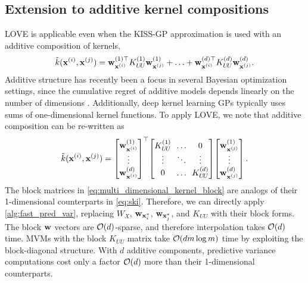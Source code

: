 \subsection{Extension to additive kernel compositions}
LOVE{} is applicable even when the KISS-GP approximation is used with an additive composition of kernels,
%
\begin{equation}
  \tilde{k}(\mathbf{x}^{(i)}, \mathbf{x}^{(j)}) =
  \mathbf{w}^{(1)\top}_{\mathbf{x}^{(i)}} K^{(1)}_{U \! U} \mathbf{w}^{(1)}_{\mathbf{x}^{(j)}} + \ldots + \mathbf{w}^{(d)\top}_{\mathbf{x}^{(i)}} K^{(d)}_{U \! U} \mathbf{w}^{(d)}_{\mathbf{x}^{(j)}}.
  \notag
\end{equation}
Additive structure has recently been a focus in several Bayesian optimization settings, since the cumulative regret of additive models depends linearly on the number of dimensions
\cite{kandasamy2015high,wang2017batched,gardner2017discovering,wang2017max}.
Additionally, deep kernel learning GPs \citep{wilson2016stochastic,wilson2016deep} typically uses sums of one-dimensional kernel functions.
To apply LOVE{}, we note that additive composition can be re-written as
%
\begin{equation}
  \tilde{k}(\bx^{(i)}, \bx^{(j)}) =
  \begin{bmatrix}
    \bw^{(1)}_{\bx^{(i)}} \\
    \vdots \\
    \bw^{(d)}_{\bx^{(i)}}
  \end{bmatrix}^\top
  \!
  \begin{bmatrix}
    K^{(1)}_{U \! U} & \!\! \ldots \!\! & 0 \\
    \vdots & \!\! \ddots \!\! & \vdots \\
    0 & \!\! \ldots \!\! & K^{(d)}_{U \! U}
  \end{bmatrix}
  \!
  \begin{bmatrix}
    \bw^{(1)}_{\bx^{(j)}} \\
    \vdots \\
    \bw^{(d)}_{\bx^{(j)}}
  \end{bmatrix}.
  \label{eq:multi_dimensional_kernel_block}
\end{equation}
%
The block matrices in \eqref{eq:multi_dimensional_kernel_block} are analogs of their 1-dimensional counterparts in \eqref{eq:ski}.
Therefore, we can directly apply \autoref{alg:fast_pred_var}, replacing $W_X$, $\mathbf{w}_{\mathbf{x}^*_i}$, $\mathbf{w}_{\mathbf{x}^*_j}$, and $K_{UU}$ with their block forms.
The block $\mathbf{w}$ vectors are $\bigo{d}$-sparse, and therefore interpolation takes $\bigo{d}$ time.
MVMs with the block $K_{UU}$ matrix take $\bigo{dm\log m}$ time by exploiting the block-diagonal structure. With $d$ additive components, predictive variance computations cost only a factor $\bigo{d}$ more than their 1-dimensional counterparts.
